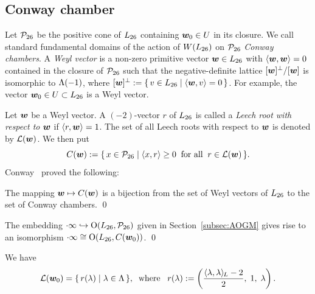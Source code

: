 \documentclass{amsart} %
\begin{document}
\subsection{Conway chamber}\label{subsec:ConwayChamber}
%
Let $\mathord{\mathcal{P}}_{26}$ be the 
positive cone of $L_{26}$ 
containing $\boldsymbol{w}_0\in U$ in its closure.
We call standard fundamental domains of the action of $W(L_{26})$ on $\mathord{\mathcal{P}}_{26}$ 
\emph{Conway chambers}.
A \emph{Weyl vector} is a non-zero primitive vector $\boldsymbol{w} \in L_{26}$
with $\langle \boldsymbol{w} , \boldsymbol{w}  \rangle=0$ contained in 
the closure of $\mathord{\mathcal{P}}_{26}$ such that
the negative-definite lattice $[\boldsymbol{w} ]^{\perp}/[\boldsymbol{w} ]$ is isomorphic to $\Lambda(-1)$,
where $[\boldsymbol{w} ]^{\perp}:=\{\,{v\in L_{26}}\mid {\langle \boldsymbol{w}, v \rangle=0} \,\}$.
For example, 
the vector $\boldsymbol{w}_0\in U\subset L_{26}$ is a Weyl vector.
\par
Let $\boldsymbol{w} $ be a Weyl vector.
A $(-2)$-vector $r$ of $L_{26}$ is called a \emph{Leech root with respect to $\boldsymbol{w} $} if $\langle r, \boldsymbol{w}  \rangle=1$.
The set of all Leech roots with respect to $\boldsymbol{w} $ is denoted by $\mathord{\mathcal{L}}(\boldsymbol{w} )$.
We then put
\[
\mathord{C}(\boldsymbol{w} ):=\{\,{x\in\mathord{\mathcal{P}}_{26}}\mid {\langle x, r \rangle\ge 0\;\;\textrm{for all}\;\; r\in \mathord{\mathcal{L}}(\boldsymbol{w})} \,\}.
\]
%
Conway~\cite{MR690711} proved the following:
%
\begin{theorem}
The mapping $\boldsymbol{w} \mapsto \mathord{C}(\boldsymbol{w})$ is a bijection from the set of Weyl vectors of $L_{26}$ to
the set of Conway chambers.
\qed
\end{theorem}
%
\begin{corollary}
The embedding $\cdot \infty\hookrightarrow \mathord{\mathrm{O}}(L_{26}, \mathord{\mathcal{P}}_{26})$ given in Section~\ref{subsec:AOGM} 
gives rise to an isomorphism 
$\cdot \infty\cong \mathord{\mathrm{O}}(L_{26}, \mathord{C}(\boldsymbol{w}_0))$.
\qed
\end{corollary}
%
We have 
\begin{equation}\label{eq:Leechrootlambda}
\mathord{\mathcal{L}}(\boldsymbol{w}_0)=\{\,{r(\lambda)}\mid {\lambda\in \Lambda} \,\},
\;\;\textrm{where}\;\;\; r(\lambda):=\left(\frac{\langle \lambda, \lambda \rangle_{\hskip -1pt L}-2}{2}, \; 1,\; \lambda\right).
\end{equation}
%
%
\end{document}
